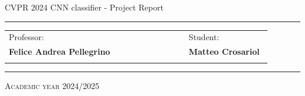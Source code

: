 \begin{titlepage}
{{	%
	\begin{center}
	{CVPR 2024 CNN classifier - Project Report}
	\end{center}
	\begin{center}
		\rule{0.95\linewidth}{3pt}
	\end{center}
	\vspace{6cm}
	\begin{center}
		\normalsize
		\begin{tabular}{p{0.65\linewidth} p{0.30\linewidth}}
			{\sffamily Professor:}&%
			{\sffamily Student:}\\
			{\sffamily \bfseries Felice Andrea Pellegrino}&%
			{\sffamily \bfseries Matteo Crosariol}\\
			{}&{}\\
		\end{tabular}
	\end{center}
	\vspace{1cm}
	\begin{center}
		\rule{0.75\linewidth}{1pt}
	\end{center}
	\begin{center}	
		{\normalsize \scshape Academic year 2024/2025}
	\end{center}
}
\date{}
\author{}
\maketitle
}
\end{titlepage}